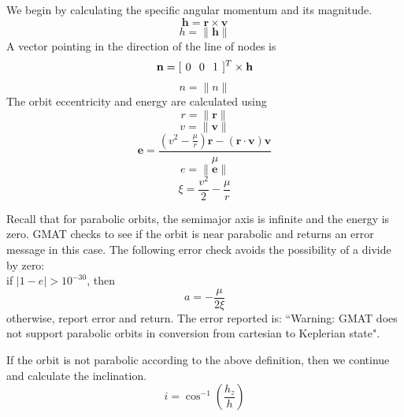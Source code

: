 We begin by calculating the specific angular momentum and its
magnitude.
%
\begin{equation}
     \mathbf{h} = \mathbf{r} \times \mathbf{v}
\end{equation}
%
\begin{equation}
     h = \|\mathbf{h} \|
\end{equation}
%
A vector pointing in the direction of the line of nodes is
%
\begin{equation}
     \mathbf{n} = [ \hspace{0.05 in} 0 \hspace{0.1 in} 0 \hspace{0.1 in} 1 \hspace{0.05
     in}]^T \times \mathbf{h}
\end{equation}
%
\begin{equation}
     n = \| n\|
\end{equation}
%
The orbit eccentricity and energy are calculated using
%
\begin{equation}
    r = \| \mathbf{r} \|
\end{equation}
%
\begin{equation}
    v = \| \mathbf{v} \|
\end{equation}
%
\begin{equation}
     \mathbf{e} = \displaystyle\frac{(v^2 - \displaystyle\frac{\mu}{r} )\mathbf{r} - (\mathbf{r}\cdot\mathbf{v}  )\mathbf{v}}{\mu}
\end{equation}
%
\begin{equation}
     e = \| \mathbf{e} \|
\end{equation}
%
\begin{equation}
     \xi = \frac{v^2}{2} - \frac{\mu}{r}
\end{equation}
%

Recall that for parabolic orbits, the semimajor axis is infinite
and the energy is zero. GMAT checks to see if the orbit is near
parabolic and returns an error message in this case.
The following error check avoids the possibility of a divide by zero:\\

\noindent if $|1 - e|> 10^{-30}$, then
\begin{equation}
     a = -\frac{\mu}{2\xi}
\end{equation}
%
otherwise, report  error and return.  The error reported is:
``Warning: GMAT does not support parabolic orbits in conversion
from cartesian to Keplerian state".

If the orbit is not parabolic according to the above definition,
then we continue and calculate the inclination.
%
\begin{equation}
     i = \cos^{-1}\left(\frac{h_z}{h}\right)
\end{equation}

